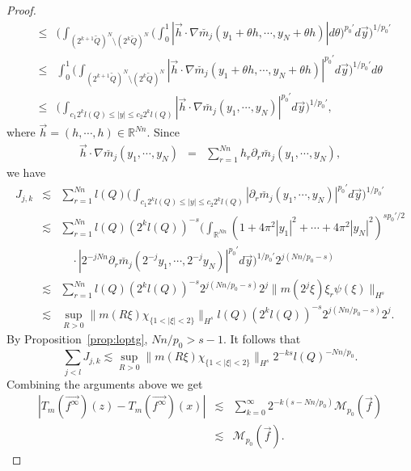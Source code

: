 \documentclass[11pt,oneside,onecolumn]{amsart}
\numberwithin{equation}{section}
\begin{document}
\begin{proof}
\begin{eqnarray*}
&\le&
  \bigg(\int_{(2^{k+1}\tilde{Q})^N\setminus (2^k\tilde{Q})^N}
   \!\!\bigg(\!\!\int_0^1\!|\vec{h}\cdot\nabla\breve{m_j}(y_1+\theta h, \cdots, y_N+\theta h)|d\theta\bigg)^{p_0'}d\vec{y}\bigg)^{1/{p_0'}}\\
&\le&\int_0^1\bigg(\int_{(2^{k+1}\tilde{Q})^N\setminus (2^k\tilde{Q})^N}|\vec{h}\cdot\nabla\breve{m_j}(y_1+\theta h, \cdots, y_N+\theta h)|^{p_0'}d\vec{y}\bigg)^{1/{p_0'}}d\theta\\
&\le&\bigg(\int_{c_1 2^kl(Q)\le |y|\le c_2 2^k l(Q)}|\vec{h}\cdot\nabla\breve{m_j}(y_1, \cdots, y_N)|^{p_0'}d\vec{y}\bigg)^{1/{p_0'}},
\end{eqnarray*}
where $\vec{h}=(h,\cdots,h)\in{\mathbb{R}}^{Nn}$. Since
\begin{eqnarray*}
\vec{h}\cdot\nabla\breve{m_j}(y_1, \cdots, y_N)&=&\sum_{r=1}^{Nn}h_r\partial_r\breve{m_j}(y_1, \cdots, y_N),
\end{eqnarray*}
we have
\begin{eqnarray*}
J_{j,k}&\lesssim&\sum_{r=1}^{Nn}l(Q)\bigg(\int_{c_1 2^kl(Q)\le |y|\le c_2 2^k l(Q)}|\partial_r\breve{m_j}(y_1, \cdots, y_N)|^{p_0'}d\vec{y}\bigg)^{1/{p_0'}}\\
&\lesssim&\sum_{r=1}^{Nn}l(Q)(2^{k} l(Q))^{-s}\bigg(\int_{{\mathbb{R}}^{Nn}}(1+4\pi^2|y_1|^2+\cdots+4\pi^2|y_N|^2)^{sp_0'/2}\\
&&\quad\cdot|2^{-jNn}\partial_r\breve{m_j}(2^{-j}y_1, \cdots, 2^{-j}y_N)|^{p_0'}d\vec{y}\bigg)^{1/{p_0'}}2^{j(Nn/{p_0}-s)}\\
&\lesssim&\sum_{r=1}^{Nn}l(Q)(2^{k} l(Q))^{-s}2^{j(Nn/{p_0}-s)}2^j\|m(2^j\xi)\xi_r\psi(\xi)\|_{H^s}\\
&\lesssim&\sup_{R>0}\|m(R\xi)\chi^{}_{\{1<|\xi|<2\}}\|_{H^s}l(Q)(2^{k} l(Q))^{-s}2^{j(Nn/{p_0}-s)}2^j.
\end{eqnarray*}
By Proposition~\ref{prop:loptg}, $Nn/{p_0}>s-1$. It follows that
\begin{equation}\label{eq:e10}
\sum_{j<l} J_{j,k}\lesssim\sup_{R>0}\|m(R\xi)\chi^{}_{\{1<|\xi|<2\}}\|_{H^s}2^{-ks}l(Q)^{-Nn/{p_0}}.
\end{equation}
Combining the arguments above we get
\begin{eqnarray*}
|T_m(\vec{f^\infty})(z)-T_m(\vec{f^\infty})(x)|
&\lesssim&\sum_{k=0}^{\infty}2^{-k(s-Nn/{p_0})}\mathcal{M}_{p_0}(\vec{f})\\
&\lesssim&\mathcal{M}_{p_0}(\vec{f}).
\end{eqnarray*}


\end{proof}
\end{document}
